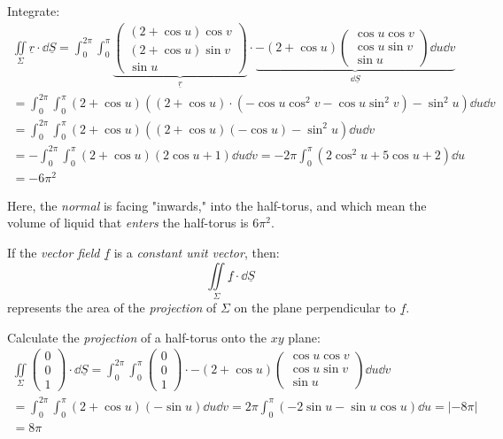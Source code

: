 \documentclass[00_complete]{subfiles}
\begin{document}
\begin{example}
    Integrate:
    \begin{gather*}
    \iint\limits_\Sigma \underline r \cdot \dd{\underline
    S}=\int_{0}^{2\pi}\int_{0}^{\pi}
    \underbrace{
    \begin{pmatrix}
        (2+\cos u) \cos v \\ (2+\cos u) \sin v \\ \sin u
    \end{pmatrix}}_{\underline r} \cdot \underbrace{-(2+\cos u)\begin{pmatrix}
        \cos u \cos v \\ \cos u \sin v \\ \sin u
    \end{pmatrix} \dd{u}\dd{v}}_{\dd{\underline S}} \\
    =\int_{0}^{2\pi}\int_{0}^{\pi}(2+\cos u)((2+\cos u)\cdot (-\cos u
    \cos^2v-\cos u \sin^2 v)-\sin^2 u) \dd{u}\dd{v} \\
    =\int_{0}^{2\pi}\int_{0}^{\pi}(2+\cos u)((2+\cos u)(-\cos u)-\sin^2
    u)\dd{u} \dd{v} \\
    =-\int_{0}^{2\pi}\int_{0}^{\pi}(2+\cos u)(2\cos u +1)
    \dd{u}\dd{v}=-2\pi\int_{0}^{\pi}(2\cos^2u +5\cos u + 2)\dd{u} \\
    =-6\pi^2
    \end{gather*}
\begin{note}
    Here, the \emph{normal} is facing "inwards," into the
    half-torus, and which mean the volume of liquid that
    \emph{enters} the half-torus is $6\pi^2$.
\end{note}
\end{example}
\begin{note}
    If the \emph{vector field} $\underline f$ is a \emph{constant unit vector},
    then:
    $$\iint\limits_\Sigma \underline f \cdot \dd{\underline S}$$
    represents the area of the \emph{projection} of $\Sigma$ on the plane
    perpendicular to $\underline f$.
\end{note}
\begin{example}
    Calculate the \emph{projection} of a half-torus onto the $xy$ plane:
    \begin{gather*}
    \iint\limits_\Sigma\begin{pmatrix}
        0 \\ 0 \\ 1
    \end{pmatrix} \cdot \dd{\underline S} = \int_{0}^{2\pi}\int_{0}^{\pi} \begin{pmatrix}
        0 \\ 0 \\ 1
    \end{pmatrix} \cdot -(2+\cos u)\begin{pmatrix}
        \cos u \cos v \\ \cos u \sin v \\ \sin u
    \end{pmatrix} \dd{u}\dd{v} \\
    =\int_{0}^{2\pi}\int_{0}^{\pi}(2+\cos u)(-\sin u)\dd{u}\dd{v} =
    2\pi\int_{0}^{\pi} (-2\sin u -\sin u \cos u)\dd{u} = |-8\pi| \\=8\pi
    \end{gather*}
\end{example}
\end{document}
